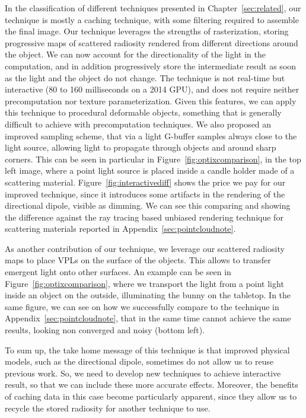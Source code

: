 In the classification of different techniques presented in Chapter~\ref{sec:related}, our technique is mostly a caching technique, with some filtering required to assemble the final image. Our technique leverages the strengths of rasterization, storing progressive maps of scattered radiosity rendered from different directions around the object. We can now account for the directionality of the light in the computation, and in addition progressively store the intermediate result as soon as the light and the object do not change. The technique is not real-time but interactive (80 to 160 milliseconds on a 2014 GPU), and does not require neither precomputation nor texture parameterization. Given this features, we can apply this technique to procedural deformable objects, something that is generally difficult to achieve with precomputation techniques. We also proposed an improved sampling scheme, that via a light G-buffer samples always close to the light source, allowing light to propagate through objects and around sharp corners. This can be seen in particular in Figure~\ref{fig:optixcomparison}, in the top left image, where a point light source is placed inside a candle holder made of a scattering material. Figure~\ref{fig:interactivediff} shows the price we pay for our improved technique, since it introduces some artifacts in the rendering of the directional dipole, visible as dimming. We can see this comparing and showing the difference against the ray tracing based unbiased rendering technique for scattering materials reported in Appendix~\ref{sec:pointcloudnote}.

As another contribution of our technique, we leverage our scattered radiosity maps to place VPLs on the surface of the objects. This allows to transfer emergent light onto other surfaces. An example can be seen in Figure~\ref{fig:optixcomparison}, where we transport the light from a point light inside an object on the outside, illuminating the bunny on the tabletop. In the same figure, we can see on how we successfully compare to the technique in Appendix~\ref{sec:pointcloudnote}, that in the same time cannot achieve the same results, looking non converged and noisy (bottom left).

To sum up, the take home message of this technique is that improved physical models, such as the directional dipole, sometimes do not allow us to reuse previous work. So, we need to develop new techniques to achieve interactive result, so that we can include these more accurate effects. Moreover, the benefits of caching data in this case become particularly apparent, since they allow us to recycle the stored radiosity for another technique to use. 

